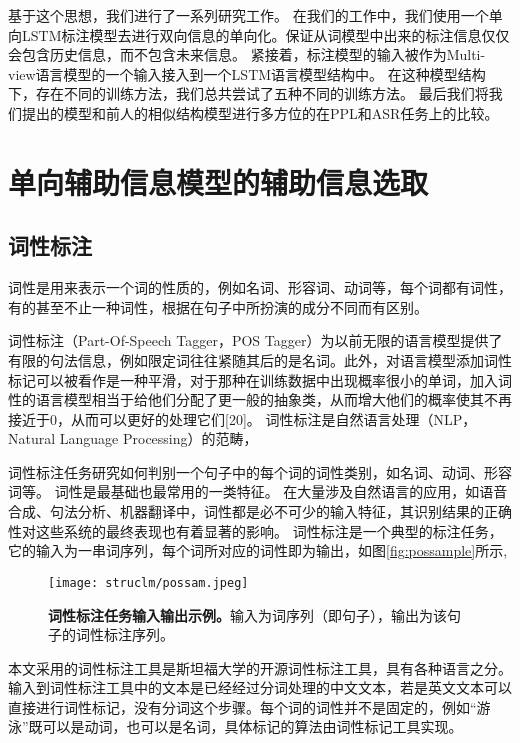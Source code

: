 基于这个思想，我们进行了一系列研究工作。
在我们的工作中，我们使用一个单向LSTM标注模型去进行双向信息的单向化。保证从词模型中出来的标注信息仅仅会包含历史信息，而不包含未来信息。
紧接着，标注模型的输入被作为Multi-view语言模型的一个输入接入到一个LSTM语言模型结构中。
在这种模型结构下，存在不同的训练方法，我们总共尝试了五种不同的训练方法。
最后我们将我们提出的模型和前人的相似结构模型进行多方位的在PPL和ASR任务上的比较。

\section{单向辅助信息模型的辅助信息选取}
\subsection{词性标注} 
词性是用来表示一个词的性质的，例如名词、形容词、动词等，每个词都有词性，有的甚至不止一种词性，根据在句子中所扮演的成分不同而有区别。

词性标注（Part-Of-Speech Tagger，POS Tagger）为以前无限的语言模型提供了有限的句法信息，例如限定词往往紧随其后的是名词。此外，对语言模型添加词性标记可以被看作是一种平滑，对于那种在训练数据中出现概率很小的单词，加入词性的语言模型相当于给他们分配了更一般的抽象类，从而增大他们的概率使其不再接近于0，从而可以更好的处理它们[20]。
词性标注是自然语言处理（NLP，Natural Language Processing）的范畴，

词性标注任务研究如何判别一个句子中的每个词的词性类别，如名词、动词、形容词等。
词性是最基础也最常用的一类特征。
在大量涉及自然语言的应用，如语音合成、句法分析、机器翻译中，词性都是必不可少的输入特征，其识别结果的正确性对这些系统的最终表现也有着显著的影响。
词性标注是一个典型的标注任务，它的输入为一串词序列，每个词所对应的词性即为输出，如图\ref{fig:possample}所示,


 \begin{figure}[tbhp!]
    \small
    \centering
    \texttt{[image: struclm/possam.jpeg]}
    \caption[词性标注任务输入输出示例]{\textbf{词性标注任务输入输出示例。}输入为词序列（即句子），输出为该句子的词性标注序列。}
    \label{fig:fpossample}
  \end{figure}

本文采用的词性标注工具是斯坦福大学的开源词性标注工具，具有各种语言之分。输入到词性标注工具中的文本是已经经过分词处理的中文文本，若是英文文本可以直接进行词性标记，没有分词这个步骤。每个词的词性并不是固定的，例如“游泳”既可以是动词，也可以是名词，具体标记的算法由词性标记工具实现。

